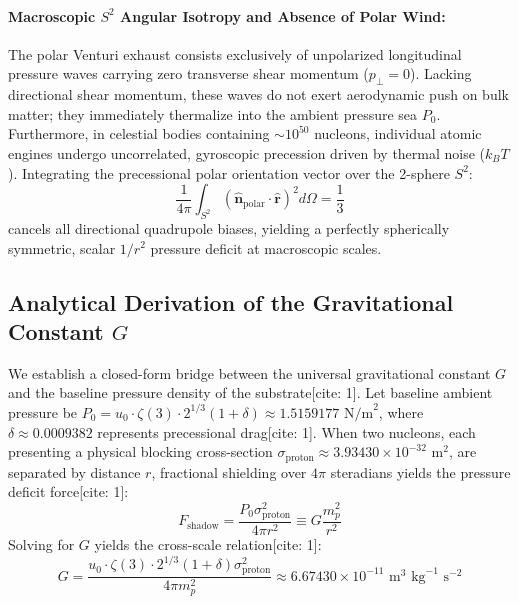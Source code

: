 \documentclass[11pt,a4paper]{article}
\begin{document}
	\paragraph{Macroscopic $S^2$ Angular Isotropy and Absence of Polar Wind:}
	The polar Venturi exhaust consists exclusively of unpolarized longitudinal pressure waves carrying zero transverse shear momentum ($p_\perp = 0$). Lacking directional shear momentum, these waves do not exert aerodynamic push on bulk matter; they immediately thermalize into the ambient pressure sea $P_0$. Furthermore, in celestial bodies containing $\sim 10^{50}$ nucleons, individual atomic engines undergo uncorrelated, gyroscopic precession driven by thermal noise ($k_B T$). Integrating the precessional polar orientation vector over the 2-sphere $S^2$:
	\begin{equation}
		\frac{1}{4\pi} \int_{S^2} (\hat{\mathbf{n}}_{\text{polar}} \cdot \hat{\mathbf{r}})^2 d\Omega = \frac{1}{3}
	\end{equation}
	cancels all directional quadrupole biases, yielding a perfectly spherically symmetric, scalar $1/r^2$ pressure deficit at macroscopic scales.
	
	\subsection{\texorpdfstring{Analytical Derivation of the Gravitational Constant $G$}{Analytical Derivation of the Gravitational Constant G}}
	We establish a closed-form bridge between the universal gravitational constant $G$ and the baseline pressure density of the substrate[cite: 1]. Let baseline ambient pressure be $P_0 = u_0 \cdot \zeta(3) \cdot 2^{1/3} (1 + \delta) \approx 1.5159177\text{ N/m}^2$, where $\delta \approx 0.0009382$ represents precessional drag[cite: 1]. When two nucleons, each presenting a physical blocking cross-section $\sigma_{\text{proton}} \approx 3.93430 \times 10^{-32}\text{ m}^2$, are separated by distance $r$, fractional shielding over $4\pi$ steradians yields the pressure deficit force[cite: 1]:
	\begin{equation}
		F_{\text{shadow}} = \frac{P_0 \sigma_{\text{proton}}^2}{4\pi r^2} \equiv G \frac{m_p^2}{r^2}
	\end{equation}
	Solving for $G$ yields the cross-scale relation[cite: 1]:
	\begin{equation}
		G = \frac{u_0 \cdot \zeta(3) \cdot 2^{1/3} (1 + \delta) \sigma_{\text{proton}}^2}{4\pi m_p^2} \approx 6.67430 \times 10^{-11} \text{ m}^3 \text{ kg}^{-1} \text{ s}^{-2}
	\end{equation}
	
\end{document}
